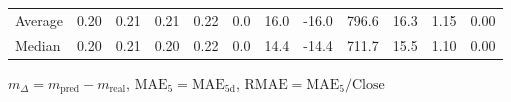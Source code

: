 \begin{threeparttable}
{\begin{tabular}{lrrrrrrrrrrr}
Average &          0.20 &          0.21 &          0.21 &        0.22 &                 0.0 &                16.0 &      -16.0 &               796.6 &             16.3 &            1.15 &                   0.00 \\
 Median &          0.20 &          0.21 &          0.20 &        0.22 &                 0.0 &                14.4 &      -14.4 &               711.7 &             15.5 &            1.10 &                   0.00 \\
\bottomrule
\end{tabular}
}
\begin{tablenotes}\footnotesize
\item $m_\Delta=m_{\text{pred}}-m_{\text{real}}$,
$\mathrm{MAE}_5=\mathrm{MAE}_{5\text{d}}$,
$\mathrm{RMAE}=\mathrm{MAE}_5/\text{Close}$
\end{tablenotes}
\end{threeparttable}
\endgroup

